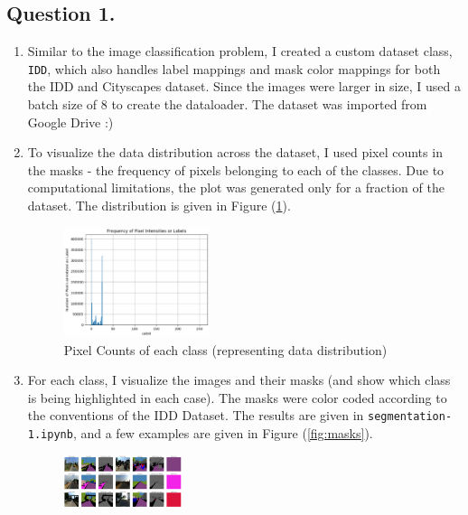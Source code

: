 \documentclass[10pt]{article}
\begin{document}
    \subsection*{\textbf{Question 1.}}
    \begin{enumerate}[label=(\alph*)]
        \item Similar to the image classification problem, I created a custom dataset
        class, \texttt{IDD}, which also handles label mappings and mask color mappings for
        both the IDD and Cityscapes dataset. Since the images were larger in size, I used
        a batch size of 8 to create the dataloader. The dataset was imported from Google Drive :)
        \item To visualize the data distribution across the dataset, I used pixel counts in
        the masks - the frequency of pixels belonging to each of the classes. Due to computational
        limitations, the plot was generated only for a fraction of the dataset. The distribution
        is given in Figure (\ref{fig:pixel-counts}).
        \begin{figure}[h!]
            \centering
            \includegraphics[width=0.4\textwidth]{Assets/Segmentation/01}
            \caption{Pixel Counts of each class (representing data distribution)}
            \label{fig:pixel-counts}
        \end{figure}
        \item For each class, I visualize the images and their masks (and show which class
        is being highlighted in each case). The masks were color coded according to the conventions
        of the IDD Dataset. The results are given in \texttt{segmentation-1.ipynb}, and a few
        examples are given in Figure (\ref{fig:masks}).
        \begin{figure}[h!]
            \centering
            \includegraphics[width=0.325\textwidth]{Assets/Segmentation/Original/02}

\end{figure}
\end{enumerate}
\end{document}
